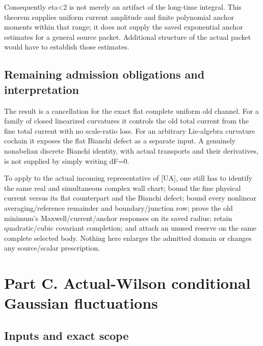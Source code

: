 \documentclass[
  11pt,
]{article}
\begin{document}
Consequently eta\textless2 is not merely an artifact of the long-time
integral. This theorem supplies uniform current amplitude and finite
polynomial anchor moments within that range; it does not supply the
saved exponential anchor estimates for a general source packet.
Additional structure of the actual packet would have to establish those
estimates.

\hypertarget{remaining-admission-obligations-and-interpretation}{%
\subsection{Remaining admission obligations and
interpretation}\label{remaining-admission-obligations-and-interpretation}}

The result is a cancellation for the exact flat complete uniform old
channel. For a family of closed linearized curvatures it controls the
old total current from the fine total current with no scale-ratio loss.
For an arbitrary Lie-algebra curvature cochain it exposes the flat
Bianchi defect as a separate input. A genuinely nonabelian discrete
Bianchi identity, with actual transports and their derivatives, is not
supplied by simply writing dF=0.

To apply to the actual incoming representative of [UA], one still has to
identify the same real and simultaneous complex wall chart; bound the
fine physical current versus its flat counterpart and the Bianchi
defect; bound every nonlinear averaging/reference remainder and
boundary/junction row; prove the old minimum's Maxwell/current/anchor
responses on its saved radius; retain quadratic/cubic covariant
completion; and attach an unused reserve on the same complete selected
body. Nothing here enlarges the admitted domain or changes any
source/scalar prescription.

\newpage

\hypertarget{part-c.-actual-wilson-conditional-gaussian-fluctuations}{%
\section{Part C. Actual-Wilson conditional Gaussian
fluctuations}\label{part-c.-actual-wilson-conditional-gaussian-fluctuations}}

\hypertarget{inputs-and-exact-scope}{%
\subsection{Inputs and exact scope}\label{inputs-and-exact-scope}}
\end{document}
